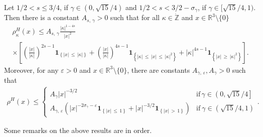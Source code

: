 \documentclass[AHL,Unicode,longabstracts,published]{cedram}
\newcommand*\gz{\mathbb{Z}}
\newcommand*\rz{\mathbb{R}}
\newcommand*\zp{\dot{\gz}}
\newcommand{\one}{\mathbf{1}}
\begin{document}
\begin{theo}\label{existencerhoh}
Let $1/2<s\leq3/4$, if $\gamma\in(0,\sqrt{15}/4)$ and $1/2<s<3/2-\sigma_\gamma$, if $\gamma\in[\sqrt{15}/4,1)$. Then there is a constant $A_{s,\,\gamma}>0$ such that for all $\kappa\in\zp$ and $x\in\rz^3\setminus\{0\}$
\begin{multline*}
\rho_{\kappa}^H(x)
\leq A_{s,\,\gamma} \frac{|\kappa|^{1-4s}}{|x|^2}\\
\times\left[\left(\frac{|x|}{|\kappa|}\right)^{2s-1}\one_{\left\{|x|\,\leq\,|\kappa|\right\}}+\left(\frac{|x|}{|\kappa|}\right)^{4s-1}\one_{\left\{|\kappa|\,\leq\,|x|\,\leq\,|\kappa|^2\right\}} + |\kappa|^{4s-1}\one_{\left\{|x|\,\geq\,|\kappa|^2\right\}}\right].
\end{multline*}
Moreover, for any $\varepsilon>0$ and $x\in\rz^3\setminus\{0\}$, there are constants $A_{\gamma,\,\varepsilon},A_\gamma>0$ such that
\begin{align}\label{eq:boundrhoh}
\rho^H(x)\leq
\begin{cases}
A_\gamma |x|^{-3/2} & \text{if}\, \gamma\in\left(0,\sqrt{15}/4\right]\\
A_{\gamma,\,\varepsilon}\left(|x|^{-2\sigma_\gamma-\varepsilon}\one_{\left\{|x|\,\leq\,1\right\}} + |x|^{-3/2}\one_{\left\{|x|\,>\,1\right\}}\right) & \text{if}\ \gamma\in\left(\sqrt{15}/4,1\right)
\end{cases}.
\end{align}
\end{theo}

Some remarks on the above results are in order.
\end{document}

